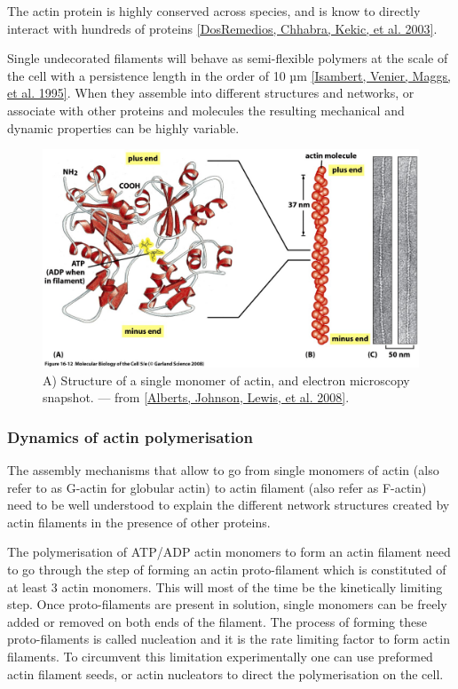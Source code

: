 \documentclass[A4paperpaper,11pt,english]{sphinxmanual}
\begin{document}
The actin protein is highly conserved across species, and is know to directly
interact with hundreds of proteins {\hyperref[index-latex:dosremedios2003]{{[}DosRemedios, Chhabra, Kekic,  et al.  2003{]}}}.

Single undecorated filaments will behave  as
semi-flexible polymers at the scale of the cell with a persistence length in the order of 10 µm {\hyperref[index-latex:isambert1995]{{[}Isambert, Venier, Maggs,  et al.  1995{]}}}. When they
assemble into different structures and networks, or associate with other proteins
and molecules the resulting mechanical and dynamic properties can be highly variable.
\begin{figure}[htbp]
\centering
\capstart

\includegraphics[width=0.700\linewidth]{actin-structure.jpg}
\caption{A) Structure of a single monomer of actin, and electron microscopy snapshot.
— from {\hyperref[index-latex:alberts2008]{{[}Alberts, Johnson, Lewis,  et al.  2008{]}}}.}\label{index-latex:fig-actin}\end{figure}


\subsubsection{Dynamics of actin polymerisation}
\label{index-latex:dynamics-of-actin-polymerisation}
The assembly mechanisms that allow to go from single monomers of actin (also
refer to as G-actin for globular actin) to actin filament (also refer as
F-actin) need to be well understood to explain the different network
structures created by actin filaments in the presence of other proteins.

The polymerisation of ATP/ADP actin monomers to form an actin filament need to
go through the step of forming an actin proto-filament which is constituted of
at least 3 actin monomers. This will most of the time be the kinetically
limiting step. Once proto-filaments are present in solution, single monomers
can be freely added or removed on both ends of the filament.  The process of
forming these proto-filaments is called nucleation and it is the rate limiting
factor to form actin filaments. To circumvent this
limitation experimentally one can use preformed actin filament seeds, or actin nucleators
to direct the polymerisation on the cell.
\end{document}
